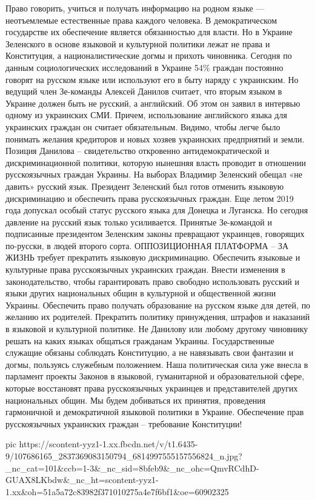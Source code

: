 Право говорить, учиться и получать информацию на родном языке — неотъемлемые естественные права каждого человека. В демократическом государстве их обеспечение является обязанностью для власти. Но в Украине Зеленского в основе языковой и культурной политики лежат не права и Конституция, а националистические догмы и прихоть чиновника. 
Сегодня по данным социологических исследований в Украине 54\% граждан постоянно говорят на русском языке или используют его в быту наряду с украинским. Но ведущий член Зе-команды Алексей Данилов считает, что вторым языком в Украине должен быть не русский, а английский. Об этом он заявил в интервью одному из украинских СМИ. Причем, использование английского языка для украинских граждан он считает обязательным. Видимо, чтобы легче было понимать желания кредиторов и новых хозяев украинских предприятий и земли. 
Позиция Данилова – свидетельство откровенно антидемократической и дискриминационной политики, которую нынешняя власть проводит в отношении русскоязычных граждан Украины. На выборах Владимир Зеленский обещал «не давить» русский язык. Президент Зеленский был готов отменить языковую дискриминацию и обеспечить права русскоязычных граждан. Еще летом 2019 года допускал особый статус русского языка для Донецка и Луганска. Но сегодня давление на русский язык только усиливается. Принятые Зе-командой и подписанные президентом Зеленским законы превращают украинцев, говорящих по-русски, в людей второго сорта. 
ОППОЗИЦИОННАЯ ПЛАТФОРМА – ЗА ЖИЗНЬ требует прекратить языковую дискриминацию. Обеспечить языковые и культурные права русскоязычных украинских граждан. Внести изменения в законодательство, чтобы гарантировать право свободно использовать русский и языки других национальных общин в культурной и общественной жизни Украины. Обеспечить право получать образование на русском языке для детей, по желанию их родителей. Прекратить политику принуждения, штрафов и наказаний в языковой и культурной политике.
Не Данилову или любому другому чиновнику решать на каких языках общаться гражданам Украины. Государственные служащие обязаны соблюдать Конституцию, а не навязывать свои фантазии и догмы, пользуясь служебным положением.
Наша политическая сила уже внесла в парламент проекты Законов в языковой, гуманитарной и образовательной сфере, которые восстановят права русскоязычных украинцев и представителей других национальных общин. Мы будем добиваться их принятия, проведения гармоничной и демократичной языковой политики в Украине.
Обеспечение прав русскоязычных украинских граждан – требование Конституции!


\ifcmt
  pic https://scontent-yyz1-1.xx.fbcdn.net/v/t1.6435-9/107686165_2837369083150794_6814997555157556824_n.jpg?_nc_cat=101&ccb=1-3&_nc_sid=8bfeb9&_nc_ohc=QmvRCdhD-GUAX8LKbdw&_nc_ht=scontent-yyz1-1.xx&oh=51a5a72c83982f371010275a4e7f6bf1&oe=60902325
\fi


